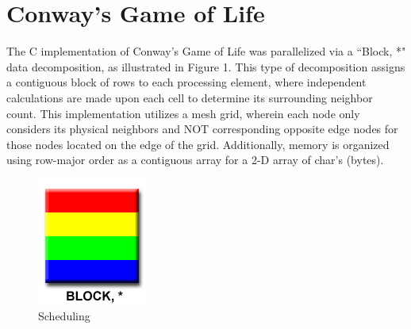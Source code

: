 \documentclass[12pt, letterpaper]{report}
\begin{document}
\section{Conway's Game of Life}

The C implementation of Conway's Game of Life was parallelized via a ``Block, *" data decomposition, as illustrated in Figure 1. This type of decomposition assigns a contiguous block of rows to each processing element, where independent calculations are made upon each cell to determine its surrounding neighbor count. This implementation utilizes a mesh grid, wherein each node only considers its physical neighbors and NOT corresponding opposite edge nodes for those nodes located on the edge of the grid. Additionally, memory is organized using row-major order as a contiguous array for a 2-D array of char's (bytes).

\begin{figure}[H]
	\centering
	\includegraphics[width=0.3\columnwidth]{block.png}
	\caption{Scheduling}
\end{figure}
\end{document}
